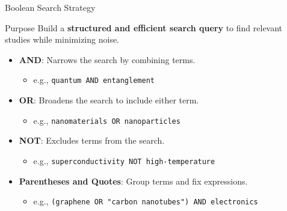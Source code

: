 \begin{frame}{Boolean Search Strategy}
  \begin{block}{Purpose}
    \small
    Build a \textbf{structured and efficient search query} to find relevant studies while minimizing noise.
  \end{block}

  \begin{itemize}
    \item \textbf{AND}: Narrows the search by combining terms.
    \begin{itemize}
      \item \small e.g., \texttt{quantum AND entanglement}
    \end{itemize}
    \pause
    \item \textbf{OR}: Broadens the search to include either term.
    \begin{itemize}
      \item \small e.g., \texttt{nanomaterials OR nanoparticles}
    \end{itemize}
    \pause
    \item \textbf{NOT}: Excludes terms from the search.
    \begin{itemize}
      \item \small e.g., \texttt{superconductivity NOT high-temperature}
    \end{itemize}
    \pause
    \item \textbf{Parentheses and Quotes}: Group terms and fix expressions.
    \begin{itemize}
      \item \small e.g., \texttt{(graphene OR "carbon nanotubes") AND electronics}
    \end{itemize}
  \end{itemize}
\end{frame}

